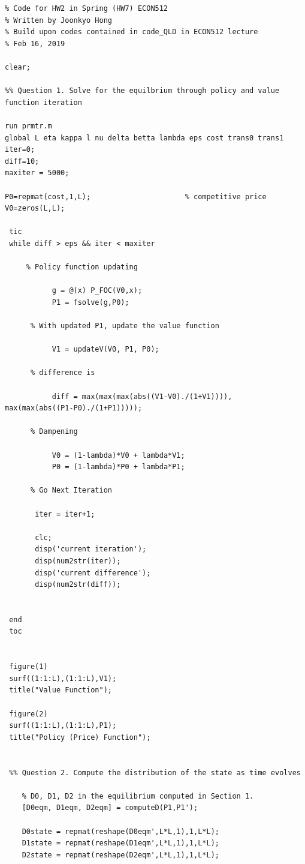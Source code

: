 \documentclass[10pt, letterpaper]{article}
\begin{document}
\clearpage

\begin{verbatim}
% Code for HW2 in Spring (HW7) ECON512
% Written by Joonkyo Hong
% Build upon codes contained in code_QLD in ECON512 lecture
% Feb 16, 2019

clear;

%% Question 1. Solve for the equilbrium through policy and value function iteration

run prmtr.m
global L eta kappa l nu delta betta lambda eps cost trans0 trans1
iter=0;
diff=10;
maxiter = 5000;

P0=repmat(cost,1,L);                      % competitive price
V0=zeros(L,L);

 tic
 while diff > eps && iter < maxiter
   
     % Policy function updating
           
           g = @(x) P_FOC(V0,x);
           P1 = fsolve(g,P0);
           
      % With updated P1, update the value function
      
           V1 = updateV(V0, P1, P0);
           
      % difference is
      
           diff = max(max(max(abs((V1-V0)./(1+V1)))),  max(max(abs((P1-P0)./(1+P1))))); 
           
      % Dampening
         
           V0 = (1-lambda)*V0 + lambda*V1;
           P0 = (1-lambda)*P0 + lambda*P1;
           
      % Go Next Iteration
      
       iter = iter+1;
       
       clc;
       disp('current iteration');
       disp(num2str(iter));
       disp('current difference');
       disp(num2str(diff));
       
       
 end   
 toc
 
 
 figure(1)
 surf((1:1:L),(1:1:L),V1);
 title("Value Function");
 
 figure(2)
 surf((1:1:L),(1:1:L),P1);
 title("Policy (Price) Function"); 
 
 
 %% Question 2. Compute the distribution of the state as time evolves
 
    % D0, D1, D2 in the equilibrium computed in Section 1.
    [D0eqm, D1eqm, D2eqm] = computeD(P1,P1');
    
    D0state = repmat(reshape(D0eqm',L*L,1),1,L*L);
    D1state = repmat(reshape(D1eqm',L*L,1),1,L*L);
    D2state = repmat(reshape(D2eqm',L*L,1),1,L*L); 
    

\end{verbatim}
\end{document}
